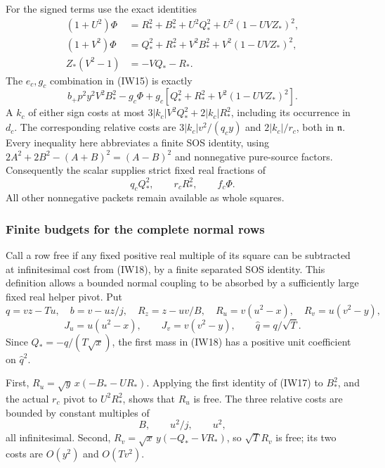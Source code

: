 For the signed terms use the exact identities
\[
\begin{split}
 (1+U^2)\Phi&=R_*^2+B_*^2+U^2Q_*^2+U^2(1-UVZ_*)^2,\\
 (1+V^2)\Phi&=Q_*^2+R_*^2+V^2B_*^2+V^2(1-UVZ_*)^2,\\
 Z_*(V^2-1)&=-VQ_*-R_*.
\end{split}                                                     \tag{IW17}
\]
The $e_c,g_c$ combination in (IW15) is exactly
\[
 b_+p^2y^2V^2B_*^2-g_c\Phi
       +g_c[Q_*^2+R_*^2+V^2(1-UVZ_*)^2].
\]
A $k_c$ of either sign costs at most
$3|k_c|V^2Q_*^2+2|k_c|R_*^2$, including its occurrence in $d_c$.
The corresponding relative costs are
$3|k_c|v^2/(q_cy)$ and $2|k_c|/r_c$, both in $\mathfrak n$.
Every inequality here abbreviates a finite SOS identity, using
$2A^2+2B^2-(A+B)^2=(A-B)^2$ and nonnegative pure-source factors.
Consequently the scalar supplies strict fixed real fractions of
\[
                       q_cQ_*^2,\qquad r_cR_*^2,
                       \qquad f_c\Phi.                \tag{IW18}
\]
All other nonnegative packets remain available as whole squares.

\subsubsection*{Finite budgets for the complete normal rows}

Call a row free if any fixed positive real multiple of its square can
be subtracted at infinitesimal cost from (IW18), by a finite separated
SOS identity. This definition allows a bounded normal coupling to be
absorbed by a sufficiently large fixed real helper pivot.
Put
\[
 q=vz-Tu,\quad b=v-uz/j,\quad R_z=z-uv/B,\quad
 R_u=v(u^2-x),\quad R_v=u(v^2-y),
\]
\[
 J_u=u(u^2-x),\qquad J_v=v(v^2-y),\qquad
 \widehat q=q/\sqrt T.
\]
Since $Q_*=-q/(T\sqrt x)$, the first mass in (IW18) has a positive
unit coefficient on $\widehat q^2$.

First, $R_u=\sqrt y\,x(-B_*-UR_*)$. Applying the first identity
of (IW17) to $B_*^2$, and the actual $r_c$ pivot to $U^2R_*^2$,
shows that $R_u$ is free. The three relative costs are bounded by
constant multiples of
\[
                         B,\qquad u^2/j,\qquad u^2,
                                                               \tag{IW19}
\]
all infinitesimal. Second,
$R_v=\sqrt x\,y(-Q_*-VR_*)$, so $\sqrt T R_v$ is free;
its two costs are $O(y^2)$ and $O(Tv^2)$.

